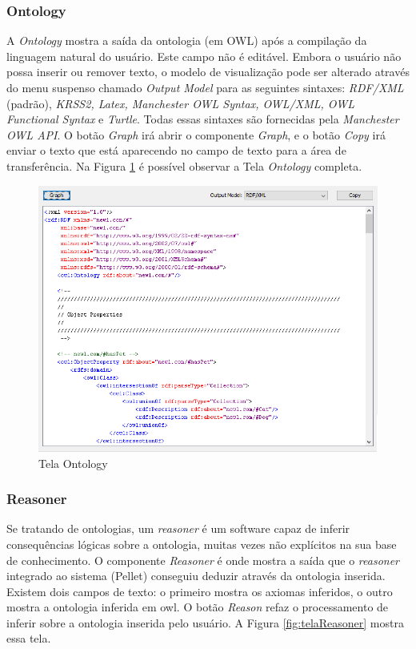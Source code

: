 \documentclass{bcc}
\begin{document}
\subsubsection{Ontology}

A \textit{Ontology} mostra a saída da ontologia (em OWL) após a compilação da linguagem natural do usuário. Este campo não é editável. Embora o usuário não possa inserir ou remover texto, o modelo de visualização pode ser alterado através do menu suspenso chamado \textit{Output Model} para as seguintes sintaxes: \textit{RDF/XML} (padrão), \textit{KRSS2, Latex, Manchester OWL Syntax, OWL/XML, OWL Functional Syntax} e \textit{Turtle}. Todas essas sintaxes são fornecidas pela \textit{Manchester OWL API}. O botão \textit{Graph} irá abrir o componente \textit{Graph}, e o botão \textit{Copy} irá enviar o texto que está aparecendo no campo de texto para a área de transferência. Na Figura \ref{fig:telaOntology} é possível observar a Tela \textit{Ontology} completa.

\begin{figure}[H]
\centering
\includegraphics[width=.7\textwidth]{Figuras/tela_ontology.png}
\caption{Tela Ontology}
\label{fig:telaOntology}
\end{figure}

\subsubsection{Reasoner}

Se tratando de ontologias, um \textit{reasoner} é um software capaz de inferir consequências lógicas sobre a ontologia, muitas vezes não explícitos na sua base de conhecimento. O componente \textit{Reasoner} é onde mostra a saída que o \textit{reasoner} integrado ao sistema (Pellet) conseguiu deduzir através da ontologia inserida. Existem dois campos de texto: o primeiro mostra os axiomas inferidos, o outro mostra a ontologia inferida em owl. O botão \textit{Reason} refaz o processamento de inferir sobre a ontologia inserida pelo usuário. A Figura \ref{fig:telaReasoner} mostra essa tela.
\end{document}
